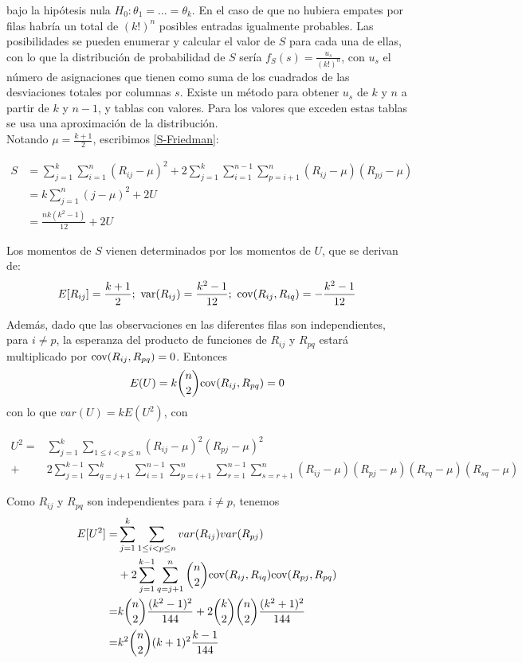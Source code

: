 	bajo la hipótesis nula $H_0: \theta_1 = \dots = \theta_k$. En el caso de que no hubiera empates por filas habría un total de $(k!)^n$ posibles entradas igualmente probables. Las posibilidades se pueden enumerar y calcular el valor de $S$ para cada una de ellas, con lo que la distribución de probabilidad de $S$ sería $f_S(s) = \frac{u_s}{(k!)^n}$, con $u_s$ el número de asignaciones que tienen como suma de los cuadrados de las desviaciones totales por columnas $s$. Existe un método para obtener $u_s$ de $k$ y $n$ a partir de $k$ y $n-1$, y tablas con valores. Para los valores que exceden estas tablas se usa una aproximación de la distribución.\\
	Notando $\mu = \frac{k+1}{2}$, escribimos \ref{S-Friedman}:
	
	\begin{align}
		S 	&= 	\sum\limits_{j=1}^k
					\sum\limits_{i=1}^n (R_{ij}-\mu)^2
				+ 2 \sum\limits_{j=1}^k
					\sum\limits_{i=1}^{n-1}
						\sum\limits_{p=i+1}^n
							(R_{ij}-\mu)(R_{pj}-\mu) 
				\nonumber \\
			&=	k \sum\limits_{j=1}^n (j-\mu)^2 + 2U 
				\nonumber \\
			&=  \frac{nk(k^2-1)}{12} + 2U	
	\label{S-Friedman2}
	\end{align}
	
	Los momentos de $S$ vienen determinados por los momentos de $U$, que se derivan de:
	\[ 	E[ R_{ij} ]= \frac{k+1}{2};\ 
		\var(R_{ij})=\frac{k^2-1}{12};\
		\cov(R_{ij},R_{iq}) = -\frac{k^2-1}{12}
	\]
	
	Además, dado que las observaciones en las diferentes filas son independientes, para $i \neq p$, la esperanza del producto de funciones de $R_{ij}$ y $R_{pq}$ estará multiplicado por $\text{cov}(R_{ij},R_{pq})=0$. Entonces
	\[ E(U) = k {n \choose 2} \text{cov}(R_{ij},R_{pq})=0 \] con lo que $var(U) = kE(U^2)$, con
	
	\begin{align*}
		U^2 =& \sum\limits_{j=1}^k
				\sum\limits_{1 \leq i < p \leq n}
					(R_{ij} - \mu)^2 (R_{pj} - \mu)^2 \\
			+& 2 
			    \sum\limits_{j=1}^{k-1}
			      \sum\limits_{q=j+1}^k
					\sum\limits_{i=1}^{n-1}
					  \sum\limits_{p=i+1}^n	
					  	\sum\limits_{r=1}^{n-1}
						  \sum\limits_{s=r+1}^n
				(R_{ij} - \mu)(R_{pj} - \mu)
				(R_{rq} - \mu)(R_{sq} - \mu)	
	\end{align*}
	
	Como $R_{ij}$ y $R_{pq}$ son independientes para $i \neq p$, tenemos
	\begin{align*}
		E[U^2] =& \sum\limits_{j=1}^k
					\sum\limits_{1 \leq i < p \leq n}
						var(R_{ij})var(R_{pj}) \\
			 &+ 2 
			    \sum\limits_{j=1}^{k-1}
			      \sum\limits_{q=j+1}^n
			    {n \choose 2}
				\text{cov}(R_{ij}, R_{iq}) \text{cov}(R_{pj}, R_{pq}) \\
			=& k {n \choose 2} \frac{(k^2-1)^2}{144} +
				2{k \choose 2}{n \choose 2} 
					\frac{(k^2+1)^2}{144} \\
			=& k^2 {n \choose 2} (k+1)^2 \frac{k-1}{144}
	\end{align*}	
	
